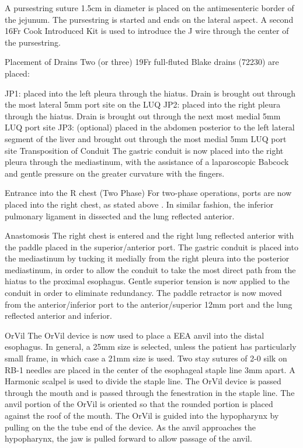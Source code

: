 \documentclass[
]{book}
\begin{document}
A pursestring suture 1.5cm in diameter is placed on the antimesenteric border of the jejunum. The pursestring is started and ends on the lateral aspect. A second 16Fr Cook Introduced Kit is used to introduce the J wire through the center of the pursestring.

Placement of Drains
Two (or three) 19Fr full-fluted Blake drains (72230) are placed:

JP1: placed into the left pleura through the hiatus. Drain is brought out through the most lateral 5mm port site on the LUQ
JP2: placed into the right pleura through the hiatus. Drain is brought out through the next most medial 5mm LUQ port site
JP3: (optional) placed in the abdomen posterior to the left lateral segment of the liver and brought out through the most medial 5mm LUQ port site
Transposition of Conduit
The gastric conduit is now placed into the right pleura through the mediastinum, with the assistance of a laparoscopic Babcock and gentle pressure on the greater curvature with the fingers.

Entrance into the R chest (Two Phase)
For two-phase operations, ports are now placed into the right chest, as stated above . In similar fashion, the inferior pulmonary ligament in dissected and the lung reflected anterior.

Anastomosis
The right chest is entered and the right lung reflected anterior with the paddle placed in the superior/anterior port. The gastric conduit is placed into the mediastinum by tucking it medially from the right pleura into the posterior mediastinum, in order to allow the conduit to take the most direct path from the hiatus to the proximal esophagus. Gentle superior tension is now applied to the conduit in order to eliminate redundancy. The paddle retractor is now moved from the anterior/inferior port to the anterior/superior 12mm port and the lung reflected anterior and inferior.

OrVil
The OrVil device is now used to place a EEA anvil into the distal esophagus. In general, a 25mm size is selected, unless the patient has particularly small frame, in which case a 21mm size is used. Two stay sutures of 2-0 silk on RB-1 needles are placed in the center of the esophageal staple line 3mm apart. A Harmonic scalpel is used to divide the staple line. The OrVil device is passed through the mouth and is passed through the fenestration in the staple line. The anvil portion of the OrVil is oriented so that the rounded portion is placed against the roof of the mouth. The OrVil is guided into the hypopharynx by pulling on the the tube end of the device. As the anvil approaches the hypopharynx, the jaw is pulled forward to allow passage of the anvil.
\end{document}
